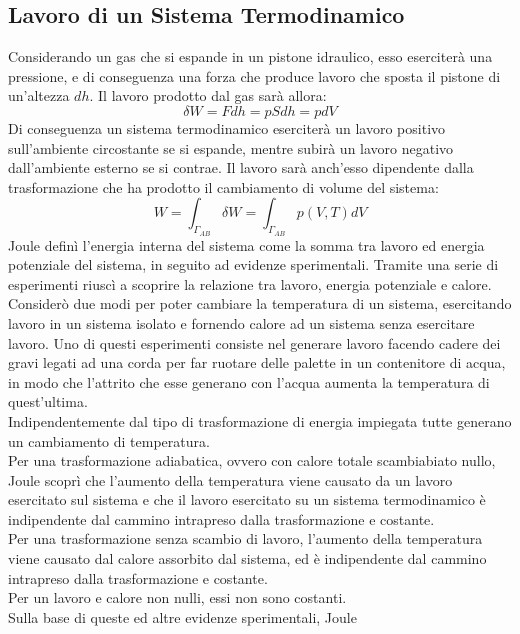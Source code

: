 \documentclass{article}
\numberwithin{equation}{subsection}
\begin{document}
\subsection{Lavoro di un Sistema Termodinamico}
Considerando un gas che si espande in un pistone idraulico, 
esso eserciterà una pressione, e di conseguenza una forza 
che produce lavoro che sposta il pistone di un'altezza $dh$. 
Il lavoro prodotto dal gas sarà allora:
\begin{equation}
    \delta W=Fdh=pSdh=pdV
\end{equation}
Di conseguenza un sistema termodinamico eserciterà un lavoro positivo
sull'ambiente circostante se si espande, mentre subirà un 
lavoro negativo dall'ambiente esterno se si contrae. 
Il lavoro sarà anch'esso dipendente dalla trasformazione 
che ha prodotto il cambiamento di volume del sistema:
\begin{equation}
    W=\int_{\Gamma_{AB}}\delta W=\int_{\Gamma_{AB}}p(V,T)dV
\end{equation}
Joule definì l'energia interna del sistema come la somma tra 
lavoro ed energia potenziale del sistema, in seguito ad 
evidenze sperimentali. Tramite una serie di esperimenti riuscì 
a scoprire la relazione tra lavoro, energia potenziale e calore. 
Considerò due modi per poter cambiare la temperatura di un 
sistema, esercitando lavoro in un sistema isolato e fornendo 
calore ad un sistema senza esercitare lavoro. Uno di questi 
esperimenti consiste nel generare lavoro facendo cadere dei 
gravi legati ad una corda per far ruotare delle palette in 
un contenitore di acqua, in modo che l'attrito che esse 
generano con l'acqua aumenta la temperatura di quest'ultima.\\
Indipendentemente dal tipo di trasformazione di energia 
impiegata tutte generano un cambiamento di temperatura.\\ 
Per una trasformazione adiabatica, ovvero con calore totale 
scambiabiato nullo, Joule scoprì che l'aumento della 
temperatura viene causato da un lavoro esercitato sul sistema e 
che il lavoro esercitato su un sistema termodinamico è 
indipendente dal cammino intrapreso dalla trasformazione e 
costante.\\
Per una trasformazione senza scambio di lavoro, l'aumento 
della temperatura viene causato dal calore assorbito dal 
sistema, ed è indipendente dal cammino intrapreso dalla trasformazione 
e costante.\\
Per un lavoro e calore non nulli, 
essi non sono costanti.\\
Sulla base di queste ed altre evidenze sperimentali, Joule 
\end{document}
